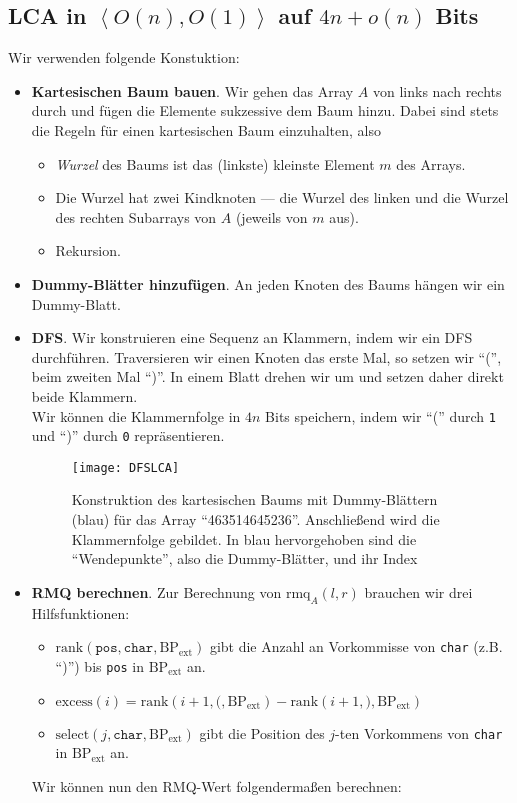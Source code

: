\subsection{LCA in \( \left\langle O(n),O(1) \right\rangle \) auf \( 4n+o(n) \) Bits}

Wir verwenden folgende Konstuktion:

\begin{itemize}
  \item \textbf{Kartesischen Baum bauen}. \quad Wir gehen das Array \( A \) von links nach rechts durch und fügen die Elemente sukzessive dem Baum hinzu. Dabei sind stets die Regeln für einen kartesischen Baum einzuhalten, also
  \begin{itemize}
    \item \emph{Wurzel} des Baums ist das (linkste) kleinste Element \( m \) des Arrays.
    \item Die Wurzel hat zwei Kindknoten --- die Wurzel des linken und die Wurzel des rechten Subarrays von \( A \) (jeweils von \( m \) aus).
    \item Rekursion.
  \end{itemize}
  \item \textbf{Dummy-Blätter hinzufügen}. \quad An jeden Knoten des Baums hängen wir ein Dummy-Blatt.
  \item \textbf{DFS}. \quad Wir konstruieren eine Sequenz an Klammern, indem wir ein DFS durchführen. Traversieren wir einen Knoten das erste Mal, so setzen wir ``('', beim zweiten Mal ``)''. In einem Blatt drehen wir um und setzen daher direkt beide Klammern. \\

  Wir können die Klammernfolge in \( 4n \) Bits speichern, indem wir ``('' durch \texttt{1} und ``)'' durch \texttt{0} repräsentieren.

  \begin{figure}[H]
    \texttt{[image: DFSLCA]}
    \captionsetup{width=.8\textwidth}
    \caption{Konstruktion des kartesischen Baums mit Dummy-Blättern (blau) für das Array ``463514645236''. Anschließend wird die Klammernfolge gebildet. In blau hervorgehoben sind die ``Wendepunkte'', also die Dummy-Blätter, und ihr Index}
  \end{figure}

  \item \textbf{RMQ berechnen}. \quad Zur Berechnung von \( \text{rmq}_A(l,r) \) brauchen wir drei Hilfsfunktionen:
  \begin{itemize}
    \item \( \text{rank}(\texttt{pos}, \texttt{char}, \text{BP}_{\text{ext}}) \) gibt die Anzahl an Vorkommisse von \texttt{char} (z.B. ``)'') bis \texttt{pos} in \( \text{BP}_{\text{ext}} \) an.
    \item \( \text{excess}(i) = \text{rank}(i+1, \texttt{(}, \text{BP}_{\text{ext}}) - \text{rank}(i+1, \texttt{)}, \text{BP}_{\text{ext}}) \)
    \item \( \text{select}(j, \texttt{char}, \text{BP}_{\text{ext}}) \) gibt die Position des \( j \)-ten Vorkommens von \texttt{char} in \( \text{BP}_{\text{ext}} \) an.
  \end{itemize}
  Wir können nun den RMQ-Wert folgendermaßen berechnen:


\end{itemize}
